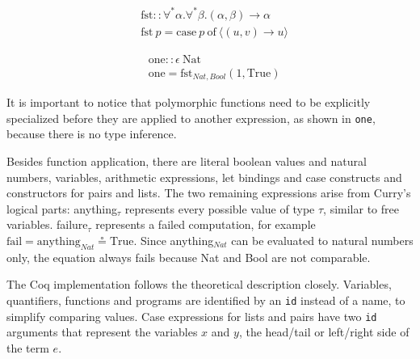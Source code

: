 \documentclass[fleqn]{scrreprt}
\newcommand{\coqinline}[1]{\texttt{#1}}
\begin{document}
\begin{figure}[H]
	\begin{minipage}{.5 \linewidth}
		\begin{align*}
		&\text{fst}::\forall^{*}\alpha.\forall^{*}\beta.(\alpha, \beta) \rightarrow\alpha\\
		&\text{fst}\: p = \text{case}\: p\: \text{of}\: \langle(u,v) \rightarrow u\rangle
		\end{align*}
	\end{minipage}
	\begin{minipage}{.5 \linewidth}
		\begin{align*}
		&\text{one} :: \epsilon \: \text{Nat}\\
		&\text{one} = \text{fst}_{Nat, Bool} (1, \text{True})
		\end{align*}
	\end{minipage}
\end{figure}
It is important to notice that polymorphic functions need to be explicitly specialized before they are applied to another expression, as shown in \texttt{one}, because there is no type inference.
\par
Besides function application, there are literal boolean values and natural numbers, variables, arithmetic expressions, let bindings and case constructs and constructors for pairs and lists. The two remaining expressions arise from Curry's logical parts: anything$_{\tau}$ represents every possible value of type $\tau$, similar to free variables. failure$_{\tau}$ represents a failed computation, for example $\text{fail} = \text{anything}_{Nat} \circeq \text{True}$. Since anything$_{Nat}$ can be evaluated to natural numbers only, the equation always fails because Nat and Bool are not comparable.
\par
The Coq implementation follows the theoretical description closely. Variables, quantifiers, functions and programs are identified by an \coqinline{id} instead of a name, to simplify comparing values. Case expressions for lists and pairs have two \coqinline{id} arguments that represent the variables $x$ and $y$, the head/tail or left/right side of the term $e$.
\end{document}
